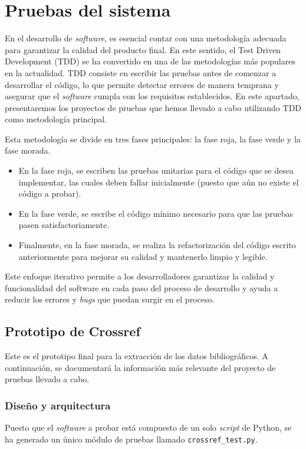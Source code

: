 \section{Pruebas del sistema}

En el desarrollo de \textit{software}, es esencial contar con una metodología adecuada para garantizar la calidad del producto final. En este sentido, el Test Driven Development (TDD) se ha convertido en una de las metodologías más populares en la actualidad. TDD consiste en escribir las pruebas antes de comenzar a desarrollar el código, lo que permite detectar errores de manera temprana y asegurar que el \textit{software} cumpla con los requisitos establecidos. En este apartado, presentaremos los proyectos de pruebas que hemos llevado a cabo utilizando TDD como metodología principal.

Esta metodología se divide en tres fases principales: la fase roja, la fase verde y la fase morada. 
\begin{itemize}
    \item En la fase roja, se escriben las pruebas unitarias para el código que se desea implementar, las cuales deben fallar inicialmente (puesto que aún no existe el código a probar). 
    \item En la fase verde, se escribe el código mínimo necesario para que las pruebas pasen satisfactoriamente.
    \item Finalmente, en la fase morada, se realiza la refactorización del código escrito anteriormente para mejorar su calidad y mantenerlo limpio y legible.
\end{itemize}

 Este enfoque iterativo permite a los desarrolladores garantizar la calidad y funcionalidad del software en cada paso del proceso de desarrollo y ayuda a reducir los errores y \textit{bugs} que puedan surgir en el proceso. 


\subsection{Prototipo de Crossref}
Este es el prototipo final para la extracción de los datos bibliográficos. A continuación, se documentará la información más relevante del proyecto de pruebas llevado a cabo.

\subsubsection{Diseño y arquitectura}
Puesto que el \textit{software} a probar está compuesto de un solo \textit{script} de Python, se ha generado un único módulo de pruebas llamado \texttt{crossref\_test.py}. 

